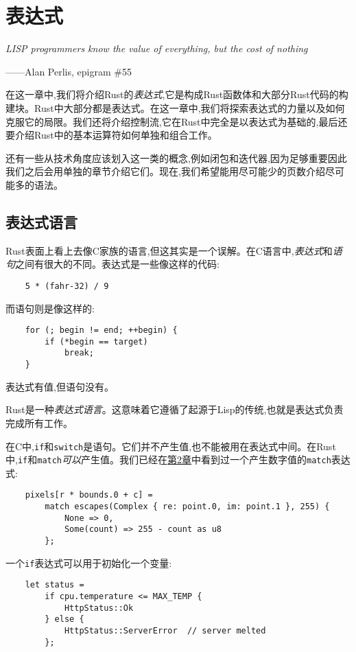 \chapter{表达式}\label{ch06}

\emph{LISP programmers know the value of everything, but the cost of nothing}

\begin{flushright}
    ——Alan Perlis, epigram \#55
\end{flushright}

在这一章中,我们将介绍Rust的\emph{表达式},它是构成Rust函数体和大部分Rust代码的构建块。Rust中大部分都是表达式。在这一章中,我们将探索表达式的力量以及如何克服它的局限。我们还将介绍控制流,它在Rust中完全是以表达式为基础的,最后还要介绍Rust中的基本运算符如何单独和组合工作。

还有一些从技术角度应该划入这一类的概念,例如闭包和迭代器,因为足够重要因此我们之后会用单独的章节介绍它们。现在,我们希望能用尽可能少的页数介绍尽可能多的语法。

\section{表达式语言}

Rust表面上看上去像C家族的语言,但这其实是一个误解。在C语言中,\emph{表达式}和\emph{语句}之间有很大的不同。表达式是一些像这样的代码:
\begin{verbatim}
    5 * (fahr-32) / 9
\end{verbatim}
而语句则是像这样的:
\begin{verbatim}
    for (; begin != end; ++begin) {
        if (*begin == target)
            break;
    }
\end{verbatim}
表达式有值,但语句没有。

Rust是一种\emph{表达式语言}。这意味着它遵循了起源于Lisp的传统,也就是表达式负责完成所有工作。

在C中,\texttt{if}和\texttt{switch}是语句。它们并不产生值,也不能被用在表达式中间。在Rust中,\texttt{if}和\texttt{match}\emph{可以}产生值。我们已经在\hyperref[ch02]{第2章}中看到过一个产生数字值的\texttt{match}表达式:
\begin{verbatim}
    pixels[r * bounds.0 + c] =
        match escapes(Complex { re: point.0, im: point.1 }, 255) {
            None => 0,
            Some(count) => 255 - count as u8
        };
\end{verbatim}

一个\texttt{if}表达式可以用于初始化一个变量:
\begin{verbatim}
    let status =
        if cpu.temperature <= MAX_TEMP {
            HttpStatus::Ok
        } else {
            HttpStatus::ServerError  // server melted
        };
\end{verbatim}

